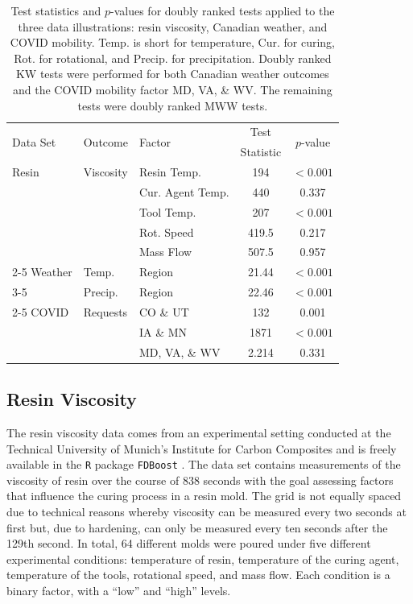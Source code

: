 \documentclass[12pt]{article}
\theoremstyle{plain}
\begin{document}
\begin{table}
\centering
\caption{ Test statistics and $p$-values for doubly ranked tests applied to the three data illustrations: resin viscosity, Canadian weather, and COVID mobility. Temp. is short for temperature, Cur. for curing, Rot. for rotational, and Precip. for precipitation. Doubly ranked KW tests were performed for both Canadian weather outcomes and the COVID mobility factor MD, VA, \& WV. The remaining tests were doubly ranked MWW tests. \label{t:data}}
\vspace{5pt}
\begin{tabular}{lllcc}
  \hline
\multirow{2}{*}{Data Set} & \multirow{2}{*}{Outcome} & \multirow{2}{*}{Factor} &  Test & \multirow{2}{*}{$p$-value}  \\
 &   &  & Statistic &  \\ 
  \hline
Resin & 
Viscosity  &  Resin Temp. & 194 & $<0.001$   \\
 & & Cur. Agent Temp. & 440 & 0.337   \\
 & & Tool Temp. & 207 & $<0.001$   \\
& & Rot. Speed & 419.5 & 0.217  \\
& & Mass Flow  & 507.5 & 0.957  \\
\cline{2-5}
Weather & Temp.  &  Region & 21.44 & $<0.001$   \\
\cline{3-5}
& Precip.  &  Region & 22.46 & $<0.001$  \\ 
\cline{2-5}
COVID & Requests & CO \& UT & 132 & 0.001  \\
 & & IA \& MN & 1871 & $<0.001$ \\
 & & MD, VA, \& WV & 2.214 & 0.331   \\
    \hline
\end{tabular}
\end{table}

\subsection{Resin Viscosity}

The resin viscosity data comes from an experimental setting conducted at the Technical University of Munich's Institute for Carbon Composites and is freely available in the \texttt{R} package \texttt{FDBoost} \citep{FDboost2020}. The data set contains measurements of the viscosity of resin over the course of 838 seconds with the goal assessing factors that influence the curing process in a resin mold. The grid is not equally spaced due to technical reasons whereby viscosity can be measured every two seconds at first but, due to hardening, can only be measured every ten seconds after the 129th second. In total, 64 different molds were poured under five different experimental conditions: temperature of resin, temperature of the curing agent, temperature of the tools, rotational speed, and mass flow. Each condition is a binary factor, with a ``low'' and ``high'' levels.
\end{document}
